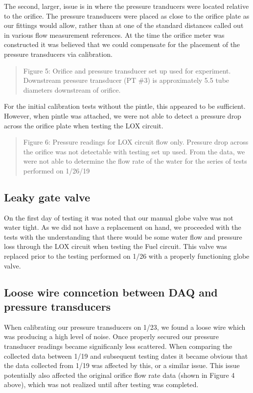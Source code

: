 \documentclass[11pt]{article}
\begin{document}
The second, larger, issue is in where the pressure tranducers were
located relative to the orifice. The pressure transducers were placed as
close to the orifice plate as our fittings would allow, rather than at
one of the standard distances called out in various flow measurement
references. At the time the orifice meter was constructed it was
believed that we could compensate for the placement of the pressure
transducers via calibration.

\begin{quote}
Figure 5: Orifice and pressure transducer set up used for experiment.
Downstream pressure transducer (PT \#3) is approximately 5.5 tube
diameters downstream of orifice.
\end{quote}

For the initial calibration tests without the pintle, this appeared to
be sufficient. However, when pintle was attached, we were not able to
detect a pressure drop across the orifice plate when testing the LOX
circuit.

\begin{quote}
Figure 6: Pressure readings for LOX circuit flow only. Pressure drop
across the orifice was not detectable with testing set up used. From the
data, we were not able to determine the flow rate of the water for the
series of tests performed on 1/26/19
\end{quote}

\subsection{Leaky gate valve}\label{leaky-gate-valve}

On the first day of testing it was noted that our manual globe valve was
not water tight. As we did not have a replacement on hand, we proceeded
with the tests with the understanding that there would be some water
flow and pressure loss through the LOX circuit when testing the Fuel
circuit. This valve was replaced prior to the testing performed on 1/26
with a properly functioning globe valve.

\subsection{Loose wire conncetion between DAQ and pressure
transducers}\label{loose-wire-conncetion-between-daq-and-pressure-transducers}

When calibrating our pressure transducers on 1/23, we found a loose wire
which was producing a high level of noise. Once properly secured our
pressure transducer readings became significanly less scattered. When
comparing the collected data between 1/19 and subsequent testing dates
it became obvious that the data collected from 1/19 was affected by
this, or a similar issue. This issue potentially also affected the
original orifice flow rate data (shown in Figure 4 above), which was not
realized until after testing was completed.
\end{document}
